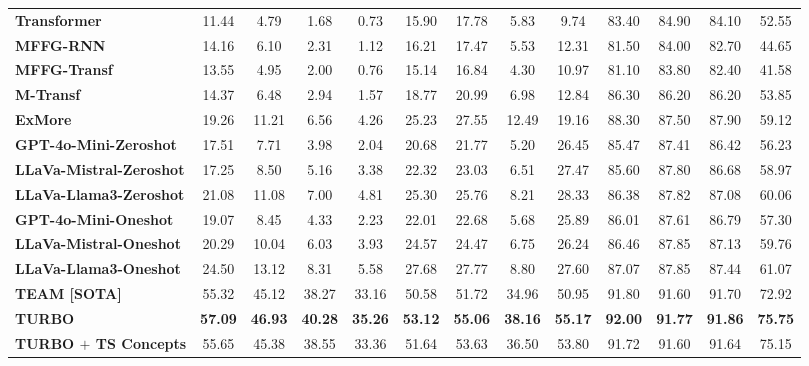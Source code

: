 \begin{table*}
{\begin{tabular}{lcccccccccccc}
    \textbf{Transformer} & 11.44 & 4.79 & 1.68 & 0.73 & 15.90 & 17.78 & 5.83 & 9.74 & 83.40 & 84.90 & 84.10 & 52.55\\
    \textbf{MFFG-RNN} & 14.16 & 6.10 & 2.31 & 1.12 & 16.21 & 17.47 & 5.53 & 12.31 & 81.50 & 84.00 & 82.70 & 44.65\\
    \textbf{MFFG-Transf} & 13.55 & 4.95 & 2.00 & 0.76 & 15.14 & 16.84 & 4.30 & 10.97 & 81.10 & 83.80 & 82.40 & 41.58\\
    \textbf{M-Transf} & 14.37 & 6.48 & 2.94 & 1.57 & 18.77 & 20.99 & 6.98 & 12.84 & 86.30 & 86.20 & 86.20 & 53.85\\
    \textbf{ExMore} & 19.26 & 11.21 & 6.56 & 4.26 & 25.23 & 27.55 & 12.49 & 19.16 & 88.30 & 87.50 & 87.90 & 59.12\\ \midrule
    \textbf{GPT-4o-Mini-Zeroshot} & 17.51 & 7.71 & 3.98 & 2.04 & 20.68 & 21.77 & 5.20 & 26.45 & 85.47 & 87.41 & 86.42 & 56.23 \\
    \textbf{LLaVa-Mistral-Zeroshot} & 17.25 & 8.50 & 5.16 & 3.38 & 22.32 & 23.03 & 6.51 & 27.47 & 85.60 & 87.80 & 86.68 & 58.97 \\
    \textbf{LLaVa-Llama3-Zeroshot} & 21.08 & 11.08 & 7.00 & 4.81 & 25.30 & 25.76 & 8.21 & 28.33 & 86.38 & 87.82 & 87.08 & 60.06 \\ \midrule    
    \textbf{GPT-4o-Mini-Oneshot} & 19.07 & 8.45 & 4.33 & 2.23 & 22.01 & 22.68 & 5.68 & 25.89 & 86.01 & 87.61 & 86.79 & 57.30 \\
    \textbf{LLaVa-Mistral-Oneshot} & 20.29 & 10.04 & 6.03 & 3.93 & 24.57 & 24.47 & 6.75 & 26.24 & 86.46 & 87.85 & 87.13 & 59.76 \\
    \textbf{LLaVa-Llama3-Oneshot} & 24.50 & 13.12 & 8.31 & 5.58 & 27.68 & 27.77 & 8.80 & 27.60 & 87.07 & 87.85 & 87.44 & 61.07 \\ \midrule
    \textbf{TEAM [SOTA]} & 55.32 & 45.12 & 38.27 & 33.16 & 50.58 & 51.72 & 34.96 & 50.95 & 91.80 & 91.60 & 91.70 & 72.92 \\
    \midrule
    
    \rowcolor{red!20} \textbf{TURBO} & \textbf{57.09} & \textbf{46.93} & \textbf{40.28} & \textbf{35.26} & \textbf{53.12} & \textbf{55.06} & \textbf{38.16} & \textbf{55.17} & \textbf{92.00} & \textbf{91.77} & \textbf{91.86} & \textbf{75.75}\\     \midrule
    \textbf{TURBO $+$ TS Concepts} & 55.65 & 45.38 & 38.55 & 33.36 & 51.64 & 53.63 & 36.50 & 53.80 & 91.72 & 91.60 & 91.64 & 75.15\\ 



\end{tabular}}
\end{table*}
